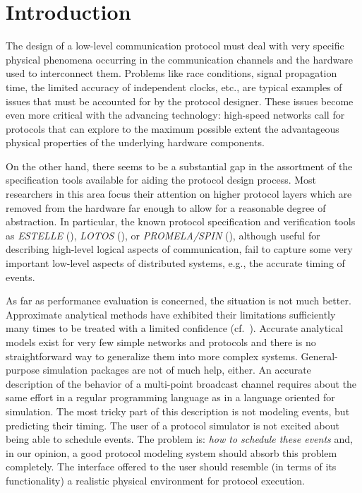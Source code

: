\section{Introduction}

The design of a low-level communication protocol must deal with very
specific physical phenomena occurring in the communication channels and
the hardware used to interconnect them.
Problems like race conditions, signal propagation time, the limited
accuracy of independent clocks, etc., are typical examples of issues
that must be accounted for by the protocol designer.
These issues become even more critical with the advancing technology:
high-speed networks call for protocols that can explore to the maximum
possible extent the advantageous physical properties of the underlying hardware
components.

On the other hand, there seems to be a substantial gap in the assortment of
the specification tools available for aiding the protocol design process.
Most researchers in this area focus their attention on higher protocol
layers which are removed from the hardware far enough to allow for a
reasonable degree of abstraction.
In particular, the known protocol specification and verification
tools as {\em ESTELLE\/}
(\cite{bud87,est87}), {\em LOTOS\/} (\cite{bob87,lob88}), or
{\em PROMELA/SPIN\/} (\cite{hol91}), although
useful for describing high-level logical aspects of communication,
fail to capture some very important low-level aspects of distributed systems,
e.g., the accurate timing of events.

As far as performance evaluation is concerned, the situation is not much better.
Approximate analytical methods have exhibited their limitations sufficiently
many times to be treated with a limited confidence (cf.\ 
\cite{bmk88,mis86}).
Accurate analytical models exist for very few simple networks and protocols
and there is no straightforward way to generalize them into more complex
systems.
General-purpose simulation packages are not of much help, either.
An accurate description of the behavior of a multi-point broadcast channel
requires about the same effort in a regular programming language
as in a language oriented for simulation.
The most tricky part of this description is not modeling events, but 
predicting their timing.
The user of a protocol simulator is not excited about being able to
schedule events.
The problem is: {\em how to schedule these events\/} and, in our opinion,
a good protocol modeling system should absorb this problem completely.
The interface offered to the user should resemble (in terms of its
functionality) a realistic physical environment for protocol execution.

